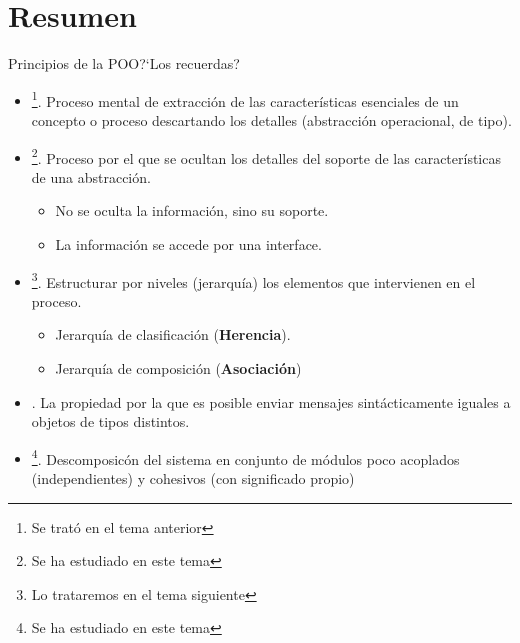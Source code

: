 \documentclass[10pt,envcountsect,spanish]{beamer}
\begin{document}





\section{Resumen}



\begin{frame}{Principios de la POO}{?`Los recuerdas?}
\begin{itemize}
\item {}\footnote[frame]{Se trató en el tema anterior}. Proceso mental de extracción de las características esenciales de un concepto o proceso descartando los detalles (abstracción operacional, de tipo).

\item {}\footnote[frame]{Se ha estudiado en este tema}. Proceso por el que se ocultan los detalles del soporte de las características de una abstracción.

\begin{itemize}
\item No se oculta la información, sino su soporte. 
\item La información se accede por una interface.
\end{itemize}

\item {}\footnote[frame]{Lo trataremos en el  tema siguiente}. Estructurar por niveles (jerarquía) los elementos que intervienen en el proceso.

\begin{itemize}
\item Jerarquía de clasificación (\textbf{Herencia}).

\item Jerarquía de composición (\textbf{Asociación})
\end{itemize}

\item {}. La propiedad por la que es posible enviar mensajes sintácticamente iguales a objetos de tipos distintos.


\item {}\footnote[frame]{Se ha estudiado en este tema}. Descomposicón del sistema en conjunto de módulos poco acoplados (independientes) y cohesivos (con significado propio)

\end{itemize}
\end{frame}
\end{document}
